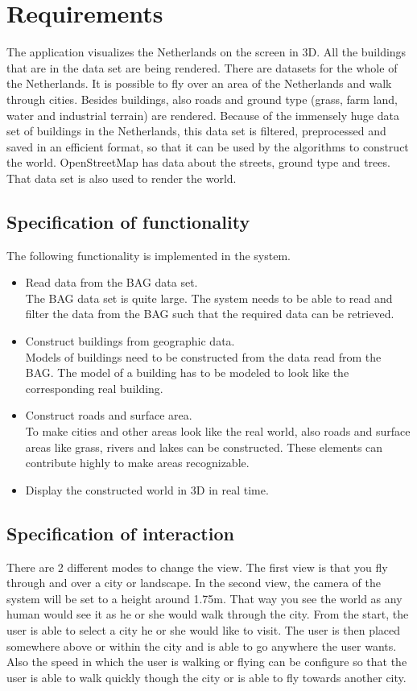 \chapter{Requirements}
\label{chap:Requirements}
The application visualizes the Netherlands on the screen in 3D. All the buildings that are in the data set are being rendered. There are datasets for the whole of the Netherlands. It is possible to fly over an area of the Netherlands and walk through cities. Besides buildings, also roads and ground type (grass, farm land, water and industrial terrain) are rendered.
Because of the immensely huge data set of buildings in the Netherlands, this data set is filtered, preprocessed and saved in an efficient format, so that it can be used by the algorithms to construct the world. OpenStreetMap has data about the streets, ground type and trees. That data set is also used to render the world.

\section{Specification of functionality}
\label{sec:SpecificationOfFunctionality}
The following functionality is implemented in the system.
\begin{itemize}
  \item Read data from the BAG data set.\\
    The BAG data set is quite large. The system needs to be able to read and filter the data from the BAG such that the required data can be retrieved.
  \item Construct buildings from geographic data. \\
    Models of buildings need to be constructed from the data read from the BAG. The model of a building has to be modeled to look like the corresponding real building.
  \item Construct roads and surface area.\\
    To make cities and other areas look like the real world, also roads and surface areas like grass, rivers and lakes can be constructed. These elements can contribute highly to make areas recognizable.
  \item Display the constructed world in 3D in real time.\\
\end{itemize} 
\section{Specification of interaction}
\label{sec:SpecificationOfInteraction}
There are 2 different modes to change the view. The first view is that you fly through and over a city or landscape. In the second view, the camera of the system will be set to a height around 1.75m. That way you see the world as any human would see it as he or she would walk through the city. From the start, the user is able to select a city he or she would like to visit. The user is then placed somewhere above or within the city and is able to go anywhere the user wants. Also the speed in which the user is walking or flying can be configure so that the user is able to walk quickly though the city or is able to fly towards another city.

